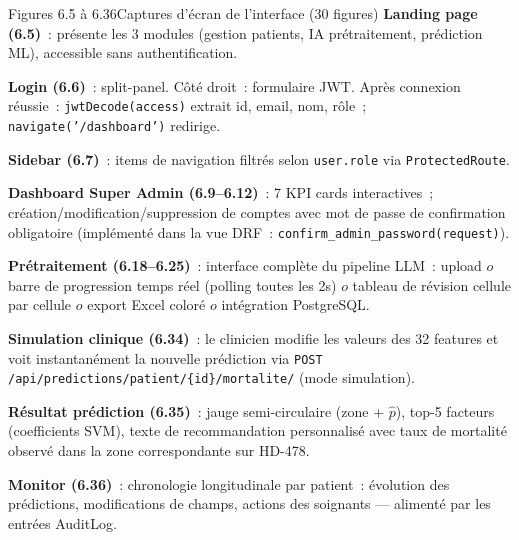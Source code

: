 \documentclass[12pt,a4paper]{article}
\begin{document}
\begin{figbox}{Figures 6.5 à 6.36}{Captures d'écran de l'interface (30 figures)}
\textbf{Landing page (6.5)}~: présente les 3 modules (gestion patients, IA
prétraitement, prédiction ML), accessible sans authentification.

\textbf{Login (6.6)}~: split-panel. Côté droit~: formulaire JWT.
Après connexion réussie~: \texttt{jwtDecode(access)} extrait id, email, nom, rôle~;
\texttt{navigate('/dashboard')} redirige.

\textbf{Sidebar (6.7)}~: items de navigation filtrés selon \texttt{user.role}
via \texttt{ProtectedRoute}.

\textbf{Dashboard Super Admin (6.9--6.12)}~: 7 KPI cards interactives~;
création/modification/suppression de comptes avec mot de passe de confirmation
obligatoire (implémenté dans la vue DRF~: \texttt{confirm\_admin\_password(request)}).

\textbf{Prétraitement (6.18--6.25)}~: interface complète du pipeline LLM~:
upload $	o$ barre de progression temps réel (polling toutes les 2s) $	o$ tableau
de révision cellule par cellule $	o$ export Excel coloré $	o$ intégration PostgreSQL.

\textbf{Simulation clinique (6.34)}~: le clinicien modifie les valeurs des 32
features et voit instantanément la nouvelle prédiction via
\texttt{POST /api/predictions/patient/\{id\}/mortalite/} (mode simulation).

\textbf{Résultat prédiction (6.35)}~: jauge semi-circulaire (zone + $\hat{p}$),
top-5 facteurs (coefficients SVM), texte de recommandation personnalisé avec
taux de mortalité observé dans la zone correspondante sur HD-478.

\textbf{Monitor (6.36)}~: chronologie longitudinale par patient~: évolution des
prédictions, modifications de champs, actions des soignants --- alimenté par
les entrées AuditLog.
\end{figbox}
\end{document}
